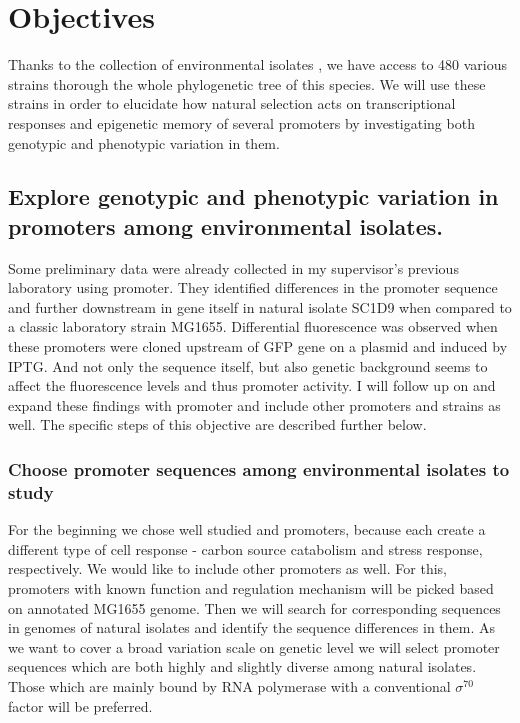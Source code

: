 \chapter{Objectives}

\shorthandoff{-} 

Thanks to the collection of environmental  isolates \cite{ishii2006presence}, we have access to 480 various strains thorough the whole phylogenetic tree of this species.
We will use these strains in order to elucidate how natural selection acts on transcriptional responses and epigenetic memory of several promoters by investigating both genotypic and phenotypic variation in them.

\section{Explore genotypic and phenotypic variation in promoters among environmental  isolates.}
Some preliminary data were already collected in my supervisor's previous laboratory using  promoter.
They identified differences in the promoter sequence and further downstream in  gene itself in natural isolate SC1\textunderscore D9 when compared to a classic laboratory strain MG1655.
Differential fluorescence was observed when these promoters were cloned upstream of GFP gene on a plasmid and induced by IPTG.
And not only the sequence itself, but also genetic background seems to affect the fluorescence levels and thus  promoter activity.
I will follow up on and expand these findings with  promoter and include other promoters and strains as well.
The specific steps of this objective are described further below.

\subsection{Choose promoter sequences among environmental  isolates to study}
For the beginning we chose well studied  and  promoters, because each create a different type of cell response - carbon source catabolism and stress response, respectively.
We would like to include other promoters as well.
For this, promoters with known function and regulation mechanism will be picked based on annotated MG1655 genome.
Then we will search for corresponding sequences in genomes of natural isolates and identify the sequence differences in them.
As we want to cover a broad variation scale on genetic level we will select promoter sequences which are both highly and slightly diverse among natural isolates.
Those which are mainly bound by RNA polymerase with a conventional $\sigma^{70}$ factor will be preferred.

